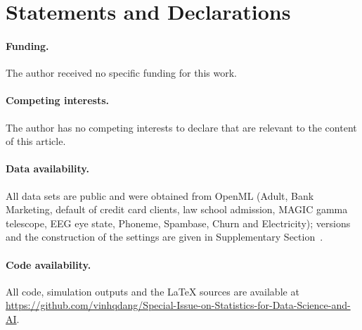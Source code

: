 \section*{Statements and Declarations}
\paragraph{Funding.} The author received no specific funding for this work.
\paragraph{Competing interests.} The author has no competing interests to declare that are relevant to the content of this article.
\paragraph{Data availability.} All data sets are public and were obtained from OpenML (Adult, Bank Marketing, default of credit card clients, law school admission, MAGIC gamma telescope, EEG eye state, Phoneme, Spambase, Churn and Electricity); versions and the construction of the settings are given in Supplementary Section~.
\paragraph{Code availability.} All code, simulation outputs and the \LaTeX{} sources are available at \url{https://github.com/vinhqdang/Special-Issue-on-Statistics-for-Data-Science-and-AI}.
